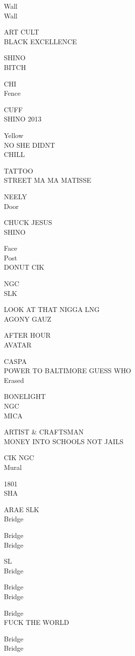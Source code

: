 \documentclass[10pt,letterpaper]{article}
\begin{document}
Wall\\
Wall

ART CULT\\
BLACK EXCELLENCE

SHINO\\
BITCH

CHI\\
Fence

CUFF\\
SHINO 2013

Yellow\\
NO SHE DIDNT\\
CHILL

TATTOO\\
STREET MA MA MATISSE

NEELY\\
Door

CHUCK JESUS\\
SHINO

Face\\
Post\\
DONUT CIK

NGC\\
SLK

LOOK AT THAT NIGGA LNG\\
AGONY GAUZ

AFTER HOUR\\
AVATAR

CASPA\\
POWER TO BALTIMORE GUESS WHO\\
Erased

BONELIGHT\\
NGC\\
MICA

ARTIST \& CRAFTSMAN\\
MONEY INTO SCHOOLS NOT JAILS

CIK NGC\\
Mural

1801\\
SHA

ARAE SLK\\
Bridge

Bridge\\
Bridge

SL\\
Bridge

Bridge\\
Bridge

Bridge\\
FUCK THE WORLD

Bridge\\
Bridge
\end{document}
